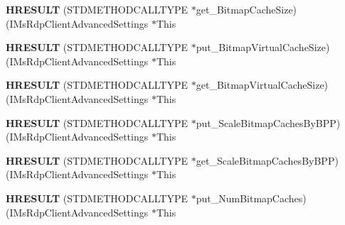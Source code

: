 \begin{DoxyCompactItemize}
\mbox{\label{struct_i_ms_rdp_client_advanced_settings_vtbl_a463cad4ffc789a5bdff7b87ffcf7c030}} 
{\bfseries H\+R\+E\+S\+U\+LT} (S\+T\+D\+M\+E\+T\+H\+O\+D\+C\+A\+L\+L\+T\+Y\+PE $\ast$get\+\_\+\+Bitmap\+Cache\+Size)(I\+Ms\+Rdp\+Client\+Advanced\+Settings $\ast$This
\item 
\mbox{\label{struct_i_ms_rdp_client_advanced_settings_vtbl_ae458f41d42836c787f371cc82aa9c3dd}} 
{\bfseries H\+R\+E\+S\+U\+LT} (S\+T\+D\+M\+E\+T\+H\+O\+D\+C\+A\+L\+L\+T\+Y\+PE $\ast$put\+\_\+\+Bitmap\+Virtual\+Cache\+Size)(I\+Ms\+Rdp\+Client\+Advanced\+Settings $\ast$This
\item 
\mbox{\label{struct_i_ms_rdp_client_advanced_settings_vtbl_a393ebcf4c34d5904bf617e758bb8b0e2}} 
{\bfseries H\+R\+E\+S\+U\+LT} (S\+T\+D\+M\+E\+T\+H\+O\+D\+C\+A\+L\+L\+T\+Y\+PE $\ast$get\+\_\+\+Bitmap\+Virtual\+Cache\+Size)(I\+Ms\+Rdp\+Client\+Advanced\+Settings $\ast$This
\item 
\mbox{\label{struct_i_ms_rdp_client_advanced_settings_vtbl_a9ca917e8823b4f2b126c3ece16d4389a}} 
{\bfseries H\+R\+E\+S\+U\+LT} (S\+T\+D\+M\+E\+T\+H\+O\+D\+C\+A\+L\+L\+T\+Y\+PE $\ast$put\+\_\+\+Scale\+Bitmap\+Caches\+By\+B\+PP)(I\+Ms\+Rdp\+Client\+Advanced\+Settings $\ast$This
\item 
\mbox{\label{struct_i_ms_rdp_client_advanced_settings_vtbl_ab852a260256f9188160eb335c036cfa0}} 
{\bfseries H\+R\+E\+S\+U\+LT} (S\+T\+D\+M\+E\+T\+H\+O\+D\+C\+A\+L\+L\+T\+Y\+PE $\ast$get\+\_\+\+Scale\+Bitmap\+Caches\+By\+B\+PP)(I\+Ms\+Rdp\+Client\+Advanced\+Settings $\ast$This
\item 
\mbox{\label{struct_i_ms_rdp_client_advanced_settings_vtbl_a247023bf29364c184b73070bd3af44a5}} 
{\bfseries H\+R\+E\+S\+U\+LT} (S\+T\+D\+M\+E\+T\+H\+O\+D\+C\+A\+L\+L\+T\+Y\+PE $\ast$put\+\_\+\+Num\+Bitmap\+Caches)(I\+Ms\+Rdp\+Client\+Advanced\+Settings $\ast$This
\item 
\mbox{\label{struct_i_ms_rdp_client_advanced_settings_vtbl_a2103bba5e522a0a7e86ed7f96e61e3b1}} 

\end{DoxyCompactItemize}
